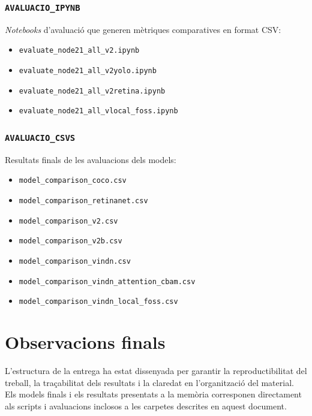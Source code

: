 \documentclass[11pt,a4paper]{article}
\begin{document}
\subsubsection{\texttt{AVALUACIO\_IPYNB}}

\textit{Notebooks} d’avaluació que generen mètriques comparatives en format CSV:

\begin{itemize}
    \item \texttt{evaluate\_node21\_all\_v2.ipynb}
    \item \texttt{evaluate\_node21\_all\_v2yolo.ipynb}
    \item \texttt{evaluate\_node21\_all\_v2retina.ipynb}
    \item \texttt{evaluate\_node21\_all\_vlocal\_foss.ipynb}
\end{itemize}

\subsubsection{\texttt{AVALUACIO\_CSVS}}

Resultats finals de les avaluacions dels models:

\begin{itemize}
    \item \texttt{model\_comparison\_coco.csv}
    \item \texttt{model\_comparison\_retinanet.csv}
    \item \texttt{model\_comparison\_v2.csv}
    \item \texttt{model\_comparison\_v2b.csv}
    \item \texttt{model\_comparison\_vindn.csv}
    \item \texttt{model\_comparison\_vindn\_attention\_cbam.csv}
    \item \texttt{model\_comparison\_vindn\_local\_foss.csv}
\end{itemize}

\section{Observacions finals}

L’estructura de la entrega ha estat dissenyada per garantir la reproductibilitat
del treball, la traçabilitat dels resultats i la claredat en l’organització del
material.  
Els models finals i els resultats presentats a la memòria corresponen directament
als scripts i avaluacions inclosos a les carpetes descrites en aquest document.
\end{document}
